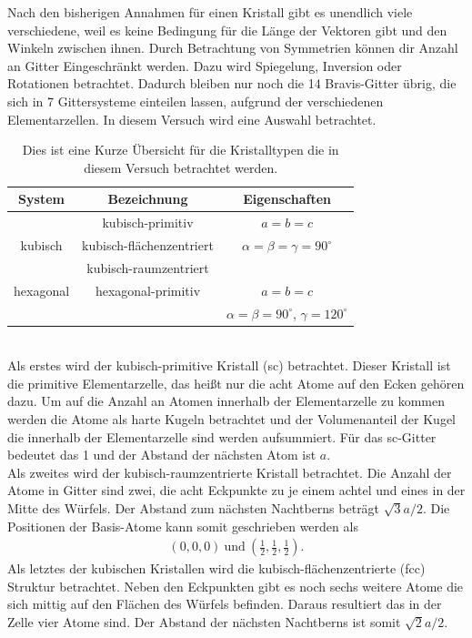 Nach den bisherigen Annahmen für einen Kristall gibt es unendlich viele verschiedene, weil es keine Bedingung für die Länge der Vektoren gibt und den Winkeln zwischen ihnen. Durch Betrachtung von Symmetrien können dir Anzahl an Gitter Eingeschränkt werden. Dazu wird Spiegelung, Inversion oder Rotationen betrachtet. Dadurch bleiben nur noch die 14 Bravis-Gitter übrig, die sich in 7 Gittersysteme einteilen lassen, aufgrund der verschiedenen Elementarzellen.
In diesem Versuch wird eine Auswahl betrachtet.\\
\begin{table}[h!]
	\centering
	\begin{tabular}{c|c|c}
		System 	& Bezeichnung 				& Eigenschaften\\\hline
				& kubisch-primitiv			& $a=b=c$\\
		kubisch & kubisch-flächenzentriert	& $\alpha=\beta=\gamma=90^\circ$\\
				& kubisch-raumzentriert		&\\\hline
		hexagonal& hexagonal-primitiv		&$a=b=c$\\
				&							&$\alpha = \beta =90^\circ$, $ \gamma=120^\circ$
	\end{tabular}
	\caption{Dies ist eine Kurze Übersicht für die Kristalltypen die in diesem Versuch betrachtet werden\cite{V41}.}
	\label{tab:Kristalltypen}
\end{table}\\
Als erstes wird der kubisch-primitive Kristall (sc) betrachtet. Dieser Kristall ist die primitive Elementarzelle, das heißt nur die acht Atome auf den Ecken gehören dazu. Um auf die Anzahl an Atomen innerhalb der Elementarzelle zu kommen werden die Atome als harte Kugeln betrachtet und der Volumenanteil der Kugel die innerhalb der Elementarzelle sind werden aufsummiert. Für das sc-Gitter bedeutet das 1 und der Abstand der nächsten Atom ist $a$.\\
Als zweites wird der kubisch-raumzentrierte Kristall betrachtet. Die Anzahl der Atome in Gitter sind zwei, die acht Eckpunkte zu je einem achtel und eines in der Mitte des Würfels. Der Abstand zum nächsten Nachtberns beträgt $\sqrt{3}a/2$. Die Positionen der Basis-Atome kann somit geschrieben werden als
\begin{align}
	\left (0 , 0 , 0 \right)\ \text{und}\ \left(\frac{1}{2},\frac{1}{2},\frac{1}{2}\right).
\end{align}
Als letztes der kubischen Kristallen wird die kubisch-flächenzentrierte (fcc) Struktur betrachtet.
Neben den Eckpunkten gibt es noch sechs weitere Atome die sich mittig auf den Flächen des Würfels befinden. Daraus resultiert das in der Zelle vier Atome sind. Der Abstand der nächsten Nachtberns ist somit $\sqrt{2}a/2$.
